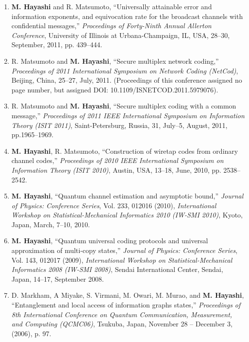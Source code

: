 \documentclass[a4paper,12pt,oneside]{article}
\begin{document}
\begin{enumerate}
    \item	\textbf{M. Hayashi} and R. Matsumoto, 
    ``Universally attainable error and information exponents, and equivocation rate for the broadcast channels with confidential messages,''
    {\em Proceedings of Forty-Ninth Annual Allerton Conference}, 
    University of Illinois at Urbana-Champaign, IL, USA, 28--30, September, 2011, pp. 439--444. 
    
    \item	R. Matsumoto and \textbf{M. Hayashi}, 
    ``Secure multiplex network coding,'' 
    {\em Proceedings of 2011 International Symposium on Network Coding (NetCod)}, 
    Beijing, China, 25--27, July, 2011.
    (Proceedings of this conference assigned no page number, but assigned DOI: 10.1109/ISNETCOD.2011.5979076).
    
    \item R. Matsumoto and \textbf{M. Hayashi}, 
    ``Secure multiplex coding with a common message,'' 
    {\em Proceedings of 2011 IEEE International Symposium on Information Theory (ISIT 2011)}, 
    Saint-Petersburg, Russia, 31, July--5, August, 2011, pp.1965--1969.
    
    \item	\textbf{M. Hayashi}, R. Matsumoto, 
    ``Construction of wiretap codes from ordinary channel codes,'' 
    {\em Proceedings of 2010 IEEE International Symposium on Information Theory (ISIT 2010)}, 
    Austin, USA, 13--18, June, 2010, pp. 2538--2542.
    
    \item	\textbf{M. Hayashi}, 
    ``Quantum channel estimation and asymptotic bound,'' 
    {\em Journal of Physics: Conference Series}, Vol. 233, 012016 (2010), 
    {\em International Workshop on Statistical-Mechanical Informatics 2010 (IW-SMI 2010)}, 
    Kyoto, Japan, March, 7--10, 2010.
    
    \item	\textbf{M. Hayashi}, 
    ``Quantum universal coding protocols and universal approximation of multi-copy states,'' 
    {\em Journal of Physics: Conference Series}, Vol. 143, 012017 (2009), 
    {\em International Workshop on Statistical-Mechanical Informatics 2008 (IW-SMI 2008)}, 
    Sendai International Center, Sendai, Japan, 14--17, September 2008.
    
    \item
    D. Markham, A Miyake, S. Virmani, M. Owari, M. Murao, and \textbf{M. Hayashi},
    ``Entanglement and local access of information graphs states,''
    {\em Proceedings of 8th International Conference on Quantum 
    Communication, Measurement, and Computing (QCMC06)},
    Tsukuba, Japan, November 28 -- December 3, (2006), p. 97.
    

\end{enumerate}
\end{document}
